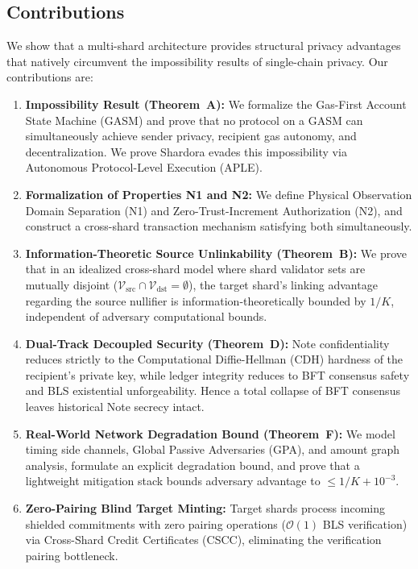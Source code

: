\documentclass[sigconf,nonacm]{acmart}
\begin{document}
\subsection{Contributions}
We show that a multi-shard architecture provides structural privacy advantages that natively circumvent the impossibility results of single-chain privacy. Our contributions are:
\begin{enumerate}
    \item \textbf{Impossibility Result (Theorem~A):} We formalize the Gas-First Account State Machine (GASM) and prove that no protocol on a GASM can simultaneously achieve sender privacy, recipient gas autonomy, and decentralization. We prove Shardora evades this impossibility via Autonomous Protocol-Level Execution (APLE).
    \item \textbf{Formalization of Properties N1 and N2:} We define Physical Observation Domain Separation (N1) and Zero-Trust-Increment Authorization (N2), and construct a cross-shard transaction mechanism satisfying both simultaneously.
    \item \textbf{Information-Theoretic Source Unlinkability (Theorem~B):} We prove that in an idealized cross-shard model where shard validator sets are mutually disjoint ($\mathcal{V}_{\text{src}} \cap \mathcal{V}_{\text{dst}} = \emptyset$), the target shard's linking advantage regarding the source nullifier is information-theoretically bounded by $1/K$, independent of adversary computational bounds.
    \item \textbf{Dual-Track Decoupled Security (Theorem~D):} Note confidentiality reduces strictly to the Computational Diffie-Hellman (CDH) hardness of the recipient's private key, while ledger integrity reduces to BFT consensus safety and BLS existential unforgeability. Hence a total collapse of BFT consensus leaves historical Note secrecy intact.
    \item \textbf{Real-World Network Degradation Bound (Theorem~F):} We model timing side channels, Global Passive Adversaries (GPA), and amount graph analysis, formulate an explicit degradation bound, and prove that a lightweight mitigation stack bounds adversary advantage to $\le 1/K + 10^{-3}$.
    \item \textbf{Zero-Pairing Blind Target Minting:} Target shards process incoming shielded commitments with zero pairing operations ($\mathcal{O}(1)$ BLS verification) via Cross-Shard Credit Certificates (CSCC), eliminating the verification pairing bottleneck.
\end{enumerate}
\end{document}
